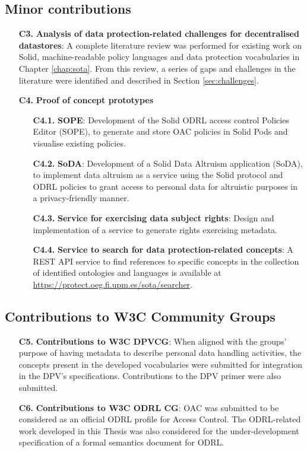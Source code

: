 \subsection{Minor contributions}
\label{sec:contr_minor}

\begin{enumerate}
    \item [\textbf{C3.}] \textbf{Analysis of data protection-related challenges for decentralised datastores}: A complete literature review was performed for existing work on Solid, machine-readable policy languages and data protection vocabularies in Chapter \ref{chap:sota}. From this review, a series of gaps and challenges in the literature were identified and described in Section \ref{sec:challenges}.
    \item [\textbf{C4.}] \textbf{Proof of concept prototypes}
    \begin{enumerate}
        \item [\textbf{C4.1.}] \textbf{SOPE}: Development of the Solid ODRL access control Policies Editor (SOPE), to generate and store OAC policies in Solid Pods and visualise existing policies.
        \item [\textbf{C4.2.}] \textbf{SoDA}: Development of a Solid Data Altruism application (SoDA), to implement data altruism as a service using the Solid protocol and ODRL policies to grant access to personal data for altruistic purposes in a privacy-friendly manner.
        \item [\textbf{C4.3.}] \textbf{Service for exercising data subject rights}: Design and implementation of a service to generate rights exercising metadata.
        \item [\textbf{C4.4.}] \textbf{Service to search for data protection-related concepts}: A REST API service to find references to specific concepts in the collection of identified ontologies and languages is available at \url{https://protect.oeg.fi.upm.es/sota/searcher}.
    \end{enumerate}
\end{enumerate}

\subsection{Contributions to W3C Community Groups}
\label{sec:contr_w3c}

\begin{enumerate}
    \item [\textbf{C5.}] \textbf{Contributions to W3C DPVCG}: When aligned with the groups' purpose of having metadata to describe personal data handling activities, the concepts present in the developed vocabularies were submitted for integration in the DPV's specifications. Contributions to the DPV primer were also submitted.
    \item [\textbf{C6.}] \textbf{Contributions to W3C ODRL CG}: OAC was submitted to be considered as an official ODRL profile for Access Control. The ODRL-related work developed in this Thesis was also considered for the under-development specification of a formal semantics document for ODRL.
\end{enumerate}